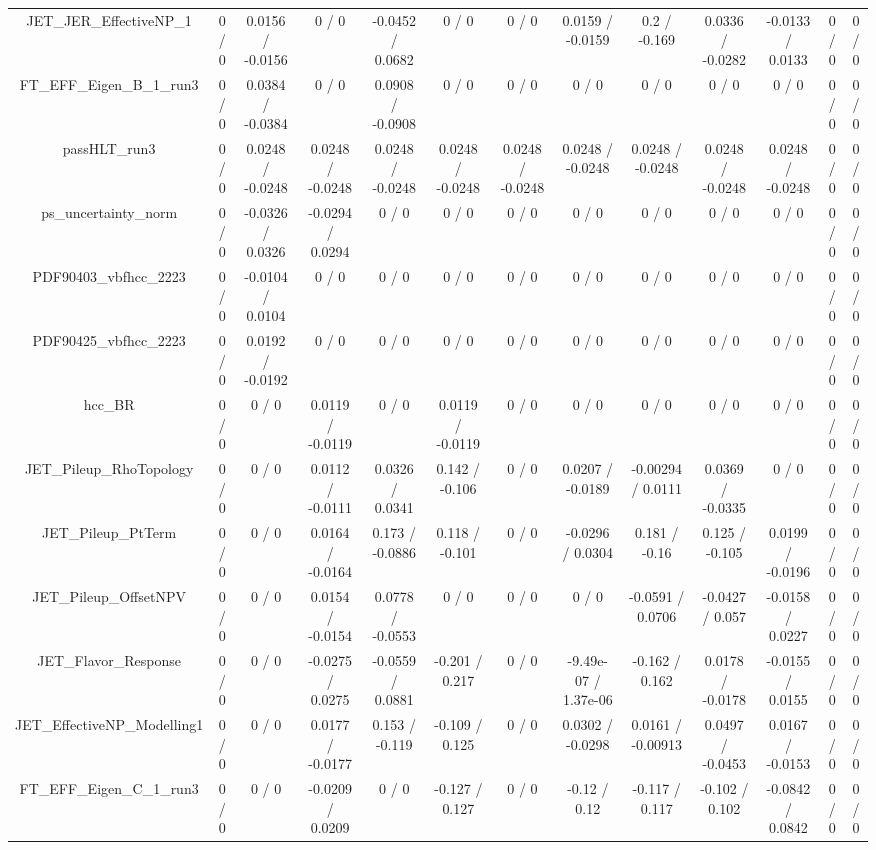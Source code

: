 \documentclass[10pt]{article}
\begin{document}
\begin{table}[htbp]
\begin{center}
\begin{tabular}{|c|c|c|c|c|c|c|c|c|c|c|c|c|}
  JET_JER_EffectiveNP_1 & 0 / 0 & 0.0156 / -0.0156 & 0 / 0 & -0.0452 / 0.0682 & 0 / 0 & 0 / 0 & 0.0159 / -0.0159 & 0.2 / -0.169 & 0.0336 / -0.0282 & -0.0133 / 0.0133 & 0 / 0 & 0 / 0 \\ 
  FT_EFF_Eigen_B_1_run3 & 0 / 0 & 0.0384 / -0.0384 & 0 / 0 & 0.0908 / -0.0908 & 0 / 0 & 0 / 0 & 0 / 0 & 0 / 0 & 0 / 0 & 0 / 0 & 0 / 0 & 0 / 0 \\ 
  passHLT_run3 & 0 / 0 & 0.0248 / -0.0248 & 0.0248 / -0.0248 & 0.0248 / -0.0248 & 0.0248 / -0.0248 & 0.0248 / -0.0248 & 0.0248 / -0.0248 & 0.0248 / -0.0248 & 0.0248 / -0.0248 & 0.0248 / -0.0248 & 0 / 0 & 0 / 0 \\ 
  ps_uncertainty_norm & 0 / 0 & -0.0326 / 0.0326 & -0.0294 / 0.0294 & 0 / 0 & 0 / 0 & 0 / 0 & 0 / 0 & 0 / 0 & 0 / 0 & 0 / 0 & 0 / 0 & 0 / 0 \\ 
  PDF90403_vbfhcc_2223 & 0 / 0 & -0.0104 / 0.0104 & 0 / 0 & 0 / 0 & 0 / 0 & 0 / 0 & 0 / 0 & 0 / 0 & 0 / 0 & 0 / 0 & 0 / 0 & 0 / 0 \\ 
  PDF90425_vbfhcc_2223 & 0 / 0 & 0.0192 / -0.0192 & 0 / 0 & 0 / 0 & 0 / 0 & 0 / 0 & 0 / 0 & 0 / 0 & 0 / 0 & 0 / 0 & 0 / 0 & 0 / 0 \\ 
  hcc_BR & 0 / 0 & 0 / 0 & 0.0119 / -0.0119 & 0 / 0 & 0.0119 / -0.0119 & 0 / 0 & 0 / 0 & 0 / 0 & 0 / 0 & 0 / 0 & 0 / 0 & 0 / 0 \\ 
  JET_Pileup_RhoTopology & 0 / 0 & 0 / 0 & 0.0112 / -0.0111 & 0.0326 / 0.0341 & 0.142 / -0.106 & 0 / 0 & 0.0207 / -0.0189 & -0.00294 / 0.0111 & 0.0369 / -0.0335 & 0 / 0 & 0 / 0 & 0 / 0 \\ 
  JET_Pileup_PtTerm & 0 / 0 & 0 / 0 & 0.0164 / -0.0164 & 0.173 / -0.0886 & 0.118 / -0.101 & 0 / 0 & -0.0296 / 0.0304 & 0.181 / -0.16 & 0.125 / -0.105 & 0.0199 / -0.0196 & 0 / 0 & 0 / 0 \\ 
  JET_Pileup_OffsetNPV & 0 / 0 & 0 / 0 & 0.0154 / -0.0154 & 0.0778 / -0.0553 & 0 / 0 & 0 / 0 & 0 / 0 & -0.0591 / 0.0706 & -0.0427 / 0.057 & -0.0158 / 0.0227 & 0 / 0 & 0 / 0 \\ 
  JET_Flavor_Response & 0 / 0 & 0 / 0 & -0.0275 / 0.0275 & -0.0559 / 0.0881 & -0.201 / 0.217 & 0 / 0 & -9.49e-07 / 1.37e-06 & -0.162 / 0.162 & 0.0178 / -0.0178 & -0.0155 / 0.0155 & 0 / 0 & 0 / 0 \\ 
  JET_EffectiveNP_Modelling1 & 0 / 0 & 0 / 0 & 0.0177 / -0.0177 & 0.153 / -0.119 & -0.109 / 0.125 & 0 / 0 & 0.0302 / -0.0298 & 0.0161 / -0.00913 & 0.0497 / -0.0453 & 0.0167 / -0.0153 & 0 / 0 & 0 / 0 \\ 
  FT_EFF_Eigen_C_1_run3 & 0 / 0 & 0 / 0 & -0.0209 / 0.0209 & 0 / 0 & -0.127 / 0.127 & 0 / 0 & -0.12 / 0.12 & -0.117 / 0.117 & -0.102 / 0.102 & -0.0842 / 0.0842 & 0 / 0 & 0 / 0 \\ 

\end{tabular}
\end{center}
\end{table}
\end{document}
